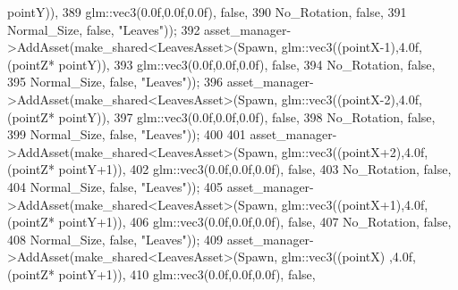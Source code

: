 \begin{DoxyCode}
      pointY)),
389                                                              glm::vec3(0.0f,0.0f,0.0f), \textcolor{keyword}{false},
390                                                              No\_Rotation, \textcolor{keyword}{false},
391                                                              Normal\_Size, \textcolor{keyword}{false}, \textcolor{stringliteral}{"Leaves"}));
392             asset\_manager->AddAsset(make\_shared<LeavesAsset>(Spawn, glm::vec3((pointX-1),4.0f,(pointZ*
      pointY)),
393                                                              glm::vec3(0.0f,0.0f,0.0f), \textcolor{keyword}{false},
394                                                              No\_Rotation, \textcolor{keyword}{false},
395                                                              Normal\_Size, \textcolor{keyword}{false}, \textcolor{stringliteral}{"Leaves"}));
396             asset\_manager->AddAsset(make\_shared<LeavesAsset>(Spawn, glm::vec3((pointX-2),4.0f,(pointZ*
      pointY)),
397                                                              glm::vec3(0.0f,0.0f,0.0f), \textcolor{keyword}{false},
398                                                              No\_Rotation, \textcolor{keyword}{false},
399                                                              Normal\_Size, \textcolor{keyword}{false}, \textcolor{stringliteral}{"Leaves"}));
400  
401             asset\_manager->AddAsset(make\_shared<LeavesAsset>(Spawn, glm::vec3((pointX+2),4.0f,(pointZ*
      pointY+1)),
402                                                              glm::vec3(0.0f,0.0f,0.0f), \textcolor{keyword}{false},
403                                                              No\_Rotation, \textcolor{keyword}{false},
404                                                              Normal\_Size, \textcolor{keyword}{false}, \textcolor{stringliteral}{"Leaves"}));
405             asset\_manager->AddAsset(make\_shared<LeavesAsset>(Spawn, glm::vec3((pointX+1),4.0f,(pointZ*
      pointY+1)),
406                                                              glm::vec3(0.0f,0.0f,0.0f), \textcolor{keyword}{false},
407                                                              No\_Rotation, \textcolor{keyword}{false},
408                                                              Normal\_Size, \textcolor{keyword}{false}, \textcolor{stringliteral}{"Leaves"}));
409             asset\_manager->AddAsset(make\_shared<LeavesAsset>(Spawn, glm::vec3((pointX)  ,4.0f,(pointZ*
      pointY+1)),
410                                                              glm::vec3(0.0f,0.0f,0.0f), \textcolor{keyword}{false},

\end{DoxyCode}
